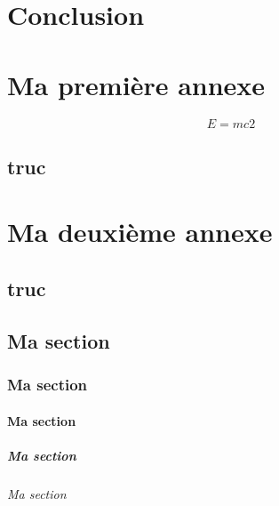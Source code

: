 \documentclass[bare]{polytech/polytech}
\begin{document}
\chapter*{Conclusion}

\appendix   

\chapter{Ma première annexe}

\label{ann:chap1}
        
\lipsum[1-4]

\begin{equation}
\label{eq:3}
E=mc2
\end{equation} 

\section{truc}
 
\label{ann:chap1:sec}

\chapter{Ma deuxième annexe}
  
\label{ann:chap2}
     
\lipsum[1-4]

\section{truc}

\label{ann:chap2:sec}

\section{Ma section}

\lipsum[1-3]

\subsection{Ma section}

\lipsum[1-3]

\subsubsection{Ma section}

\lipsum[1-3]

\paragraph{Ma section}

\lipsum[1-3]

\subparagraph{Ma section}

\lipsum[1-3]
\end{document}
